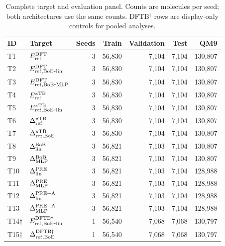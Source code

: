 \begin{table}[H]
\centering
\scriptsize
\setlength{\tabcolsep}{4pt}
\renewcommand{\arraystretch}{1.35}
\caption{Complete target and evaluation panel. Counts are molecules per seed; both architectures use the same counts. DFTB$^\dagger$ rows are display-only controls for pooled analyses.}
\begin{tabular}{llrrrrr}
\toprule
ID & Target & Seeds & Train & Validation & Test & QM9 \\
\midrule
T1 & \(E_{\rm ref}^{\rm DFT}\) & 3 & 56,830 & 7,104 & 7,104 & 130,807 \\
T2 & \(E_{\rm ref,BoE\mbox{-}lin}^{\rm DFT}\) & 3 & 56,830 & 7,104 & 7,104 & 130,807 \\
T3 & \(E_{\rm ref,BoE\mbox{-}MLP}^{\rm DFT}\) & 3 & 56,830 & 7,104 & 7,104 & 130,807 \\
T4 & \(E_{\rm ref}^{\rm xTB}\) & 3 & 56,830 & 7,104 & 7,104 & 130,807 \\
T5 & \(E_{\rm ref,BoE\mbox{-}lin}^{\rm xTB}\) & 3 & 56,830 & 7,104 & 7,104 & 130,807 \\
T6 & \(\Delta^{\rm xTB}_{\rm ref}\) & 3 & 56,830 & 7,104 & 7,104 & 130,807 \\
T7 & \(\Delta^{\rm xTB}_{\rm ref,BoE}\) & 3 & 56,830 & 7,104 & 7,104 & 130,807 \\
T8 & \(\Delta^{\rm BoB}_{\rm lin}\) & 3 & 56,821 & 7,103 & 7,104 & 130,807 \\
T9 & \(\Delta^{\rm BoB}_{\rm MLP}\) & 3 & 56,821 & 7,103 & 7,104 & 130,807 \\
T10 & \(\Delta^{\rm PRE}_{\rm lin}\) & 3 & 56,821 & 7,103 & 7,104 & 128,988 \\
T11 & \(\Delta^{\rm PRE}_{\rm MLP}\) & 3 & 56,821 & 7,103 & 7,104 & 128,988 \\
T12 & \(\Delta^{\rm PRE+A}_{\rm lin}\) & 3 & 56,821 & 7,103 & 7,104 & 128,988 \\
T13 & \(\Delta^{\rm PRE+A}_{\rm MLP}\) & 3 & 56,821 & 7,103 & 7,104 & 128,988 \\
T14$\dagger$ & \(E_{\rm ref,BoE\mbox{-}lin}^{\rm DFTB\dagger}\) & 1 & 56,540 & 7,068 & 7,068 & 130,797 \\
T15$\dagger$ & \(\Delta^{\rm DFTB\dagger}_{\rm ref,BoE}\) & 1 & 56,540 & 7,068 & 7,068 & 130,797 \\
\bottomrule
\end{tabular}
\end{table}
